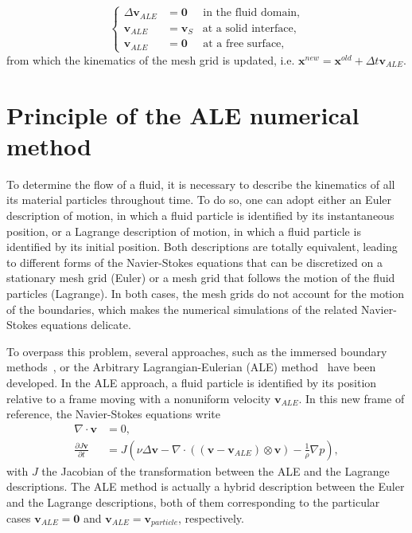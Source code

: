 \begin{equation}
  \left\{
\begin{aligned}
\Delta \mathbf{v}_{ALE} &= \mathbf{0} \;\;\;\;\; \text{in the fluid domain,}\\
\mathbf{v}_{ALE} &= \mathbf{v}_{S} \;\;\; \text{at a solid interface,}\\
\mathbf{v}_{ALE} &= \mathbf{0} \;\;\;\;\; \text{at a free surface,} 
\end{aligned}
\right.
\end{equation}
from which the kinematics of the mesh grid is updated, i.e. ${\textbf{x}}^{new}={\textbf{x}}^{old} + \Delta t{\textbf{v}}_{ALE}$.

\chapter{Principle of the ALE numerical method}
To determine the flow of a fluid, it is necessary to describe the kinematics of all its material particles throughout time. To do so, one can adopt either an Euler description of motion, in which a fluid particle is identified by its instantaneous position, or a Lagrange description of motion, in which a fluid particle is identified by its initial position. 
Both descriptions are totally equivalent, leading to different forms of the Navier-Stokes equations that can be discretized on a stationary mesh grid (Euler) or a mesh grid that follows the motion of the fluid particles (Lagrange). In both cases, the mesh grids do not account for the motion of the boundaries, which makes the numerical simulations of the related Navier-Stokes equations delicate. 

To overpass this problem, several approaches, such as the immersed boundary methods~\cite{puscas2015three, puscas2015time, puscas2015conservative}, or the Arbitrary Lagrangian-Eulerian (ALE) method~\cite{donea2004arbitrary, fourestey2004second, koobus2000computation} have been developed. 
In the ALE approach, a fluid particle is identified by its position relative to a frame moving with a nonuniform velocity ${\textbf{v}}_{ALE}$. In this new frame of reference, the Navier-Stokes equations write
\begin{subequations}\label{eq:NS_ALE}
\begin{align}
\nabla \cdot   \textbf{v} &= 0, \\
\frac{\partial J {\textbf{v}}}{\partial t}  &=  J \left(\nu\Delta {\textbf{v}}   - \nabla \cdot  ( ({\textbf{v}} - {\textbf{v}}_{ALE}) \otimes {\textbf{v}} )  - \frac{1}{\rho}\nabla p\right),
\end{align}
\end{subequations}
with $J$ the Jacobian of the transformation between the ALE and the Lagrange descriptions. The ALE method is actually a hybrid description between the Euler and the Lagrange descriptions, both of them corresponding to the particular cases ${\textbf{v}}_{ALE}={\textbf{0}}$ and ${\textbf{v}}_{ALE}={\textbf{v}}_{particle}$, respectively. 

